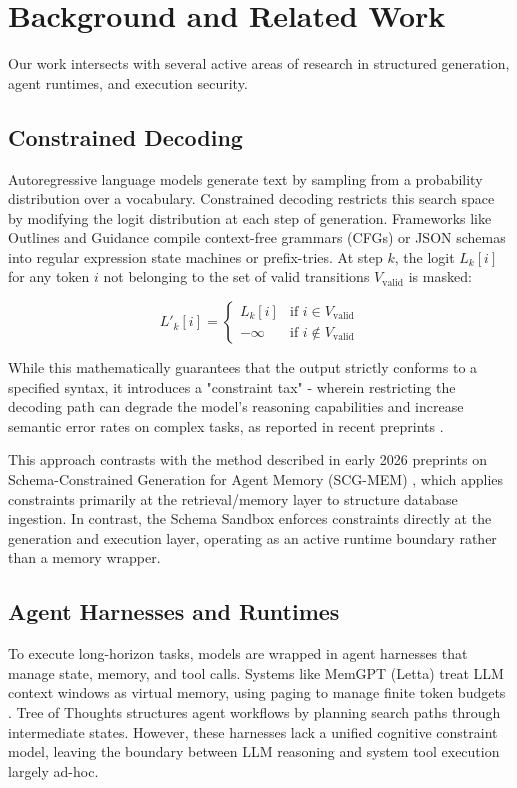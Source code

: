 \documentclass[10pt,journal,compsoc]{IEEEtran}
\begin{document}
\section{Background and Related Work}
Our work intersects with several active areas of research in structured generation, agent runtimes, and execution security.

\subsection{Constrained Decoding}
Autoregressive language models generate text by sampling from a probability distribution over a vocabulary. Constrained decoding restricts this search space by modifying the logit distribution at each step of generation. Frameworks like Outlines \cite{willard2023} and Guidance \cite{guidance2023} compile context-free grammars (CFGs) or JSON schemas into regular expression state machines or prefix-tries. At step $k$, the logit $L_k[i]$ for any token $i$ not belonging to the set of valid transitions $V_{\text{valid}}$ is masked:

\begin{equation}
L'_k[i] = \begin{cases} L_k[i] & \text{if } i \in V_{\text{valid}} \\ -\infty & \text{if } i \notin V_{\text{valid}} \end{cases}
\end{equation}

While this mathematically guarantees that the output strictly conforms to a specified syntax, it introduces a "constraint tax" - wherein restricting the decoding path can degrade the model's reasoning capabilities and increase semantic error rates on complex tasks, as reported in recent preprints \cite{ray2026}. 

This approach contrasts with the method described in early 2026 preprints on Schema-Constrained Generation for Agent Memory (SCG-MEM) \cite{zheng2026}, which applies constraints primarily at the retrieval/memory layer to structure database ingestion. In contrast, the Schema Sandbox enforces constraints directly at the generation and execution layer, operating as an active runtime boundary rather than a memory wrapper.

\subsection{Agent Harnesses and Runtimes}
To execute long-horizon tasks, models are wrapped in agent harnesses that manage state, memory, and tool calls. Systems like MemGPT (Letta) treat LLM context windows as virtual memory, using paging to manage finite token budgets \cite{packer2023}. Tree of Thoughts \cite{yao2023} structures agent workflows by planning search paths through intermediate states. However, these harnesses lack a unified cognitive constraint model, leaving the boundary between LLM reasoning and system tool execution largely ad-hoc.
\end{document}

